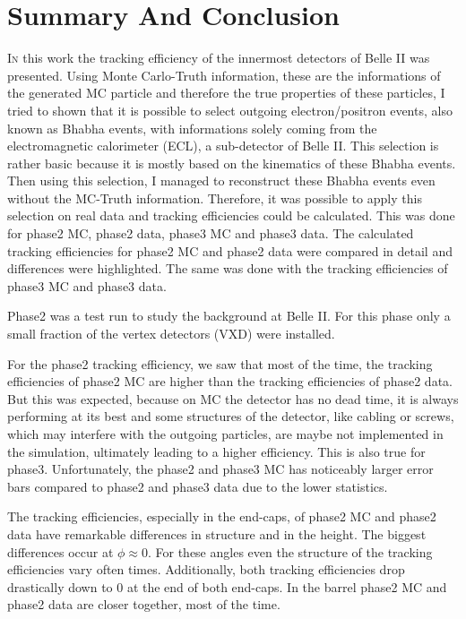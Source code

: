 \documentclass[a4paper,11pt,twosided,final,german,openbib,pdftex,listof=totoc,bibliography=totoc]{scrbook}
\begin{document}
\chapter{Summary And Conclusion}
\label{cha:Conclusion}

\lettrine{I}{n} this work the tracking efficiency of the innermost detectors of Belle II was presented. 
Using Monte Carlo-Truth information, these are the informations of the generated MC particle and therefore the true properties of these particles, I tried to shown that it is possible to select outgoing electron/positron events, also known as Bhabha events, with informations solely coming from the electromagnetic calorimeter (ECL), a sub-detector of Belle II. 
This selection is rather basic because it is mostly based on the kinematics of these Bhabha events. Then using this selection, I managed to reconstruct these Bhabha events even without the MC-Truth information. Therefore, it was possible to apply this selection on real data and tracking efficiencies could be calculated. 
This was done for phase2 MC, phase2 data, phase3 MC and phase3 data.
The calculated tracking efficiencies for phase2 MC and phase2 data were compared in detail and differences were highlighted. The same was done with the tracking efficiencies of phase3 MC and phase3 data. 
\newline 

Phase2 was a test run to study the background at Belle II. For this phase only a small fraction of the vertex detectors (VXD) were installed.

For the phase2 tracking efficiency, we saw that most of the time, the tracking efficiencies of phase2 MC are higher than the tracking efficiencies of phase2 data. But this was expected, because on MC the detector has no dead time, it is always performing at its best and some structures of the detector, like cabling or screws, which may interfere with the outgoing particles, are maybe not implemented in the simulation, ultimately leading to a higher efficiency. This is also true for phase3. Unfortunately, the phase2 and phase3 MC has noticeably larger error bars compared to phase2 and phase3 data due to the lower statistics.
\newline

The tracking efficiencies, especially in the end-caps, of phase2 MC and phase2 data have remarkable differences in structure and in the height. The biggest differences occur at $\phi \approx 0$. For these angles even the structure of the tracking efficiencies vary often times. Additionally, both tracking efficiencies drop drastically down to 0 at the end of both end-caps. In the barrel phase2 MC and phase2 data are closer together, most of the time.
\newline
\end{document}
